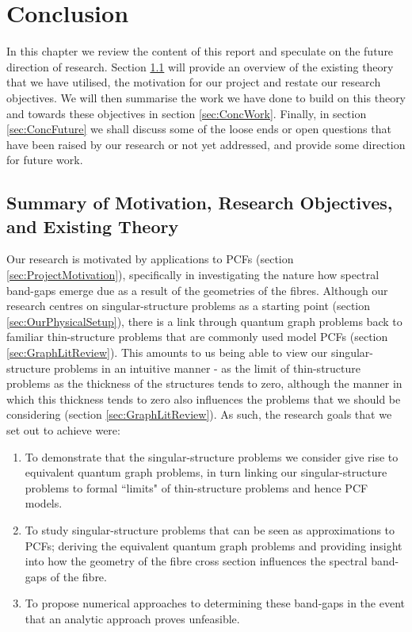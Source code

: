 \chapter{Conclusion} \label{ch:Conclusion}
In this chapter we review the content of this report and speculate on the future direction of research.
Section \ref{sec:ConcTheory} will provide an overview of the existing theory that we have utilised, the motivation for our project and restate our research objectives.
We will then summarise the work we have done to build on this theory and towards these objectives in section \ref{sec:ConcWork}.
Finally, in section \ref{sec:ConcFuture} we shall discuss some of the loose ends or open questions that have been raised by our research or not yet addressed, and provide some direction for future work.

\section{Summary of Motivation, Research Objectives, and Existing Theory} \label{sec:ConcTheory}
Our research is motivated by applications to PCFs (section \ref{sec:ProjectMotivation}), specifically in investigating the nature how spectral band-gaps emerge due as a result of the geometries of the fibres.
Although our research centres on singular-structure problems as a starting point (section \ref{sec:OurPhysicalSetup}), there is a link through quantum graph problems back to familiar thin-structure problems that are commonly used model PCFs (section \ref{sec:GraphLitReview}).
This amounts to us being able to view our singular-structure problems in an intuitive manner - as the limit of thin-structure problems as the thickness of the structures tends to zero, although the manner in which this thickness tends to zero also influences the problems that we should be considering (section \ref{sec:GraphLitReview}).
As such, the research goals that we set out to achieve were:
\begin{enumerate}
	\item To demonstrate that the singular-structure problems we consider give rise to equivalent quantum graph problems, in turn linking our singular-structure problems to formal ``limits" of thin-structure problems and hence PCF models.
	\item To study singular-structure problems that can be seen as approximations to PCFs; deriving the equivalent quantum graph problems and providing insight into how the geometry of the fibre cross section influences the spectral band-gaps of the fibre.
	\item To propose numerical approaches to determining these band-gaps in the event that an analytic approach proves unfeasible.
\end{enumerate}

